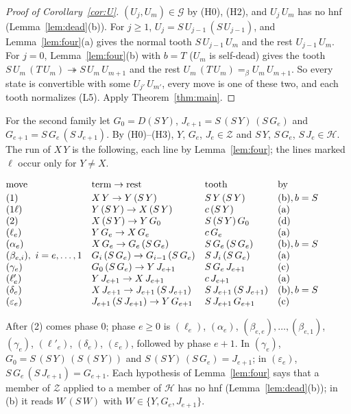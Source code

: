 \documentclass[11pt]{amsart}
\theoremstyle{definition}
\newcommand{\red}{\twoheadrightarrow}
\newcommand{\conv}{=_\beta}
\newcommand{\Hc}{\mathcal H}
\newcommand{\Gc}{\mathcal G}
\newcommand{\Zc}{\mathcal Z}
\begin{document}
\begin{proof}[Proof of Corollary~\ref{cor:U}]
$(U_j,U_m)\in\Gc$ by (H0), (H2), and $U_j\,U_m$ has no hnf (Lemma~\ref{lem:dead}(b)). For $j\ge1$,
$U_j=S\,U_{j-1}\,(S\,U_{j-1})$, and Lemma~\ref{lem:four}(a) gives the normal tooth
$S\,U_{j-1}\,U_m$ and the rest $U_{j-1}\,U_m$. For $j=0$, Lemma~\ref{lem:four}(b) with $b=T$
($U_m$ is self-dead) gives the tooth $S\,U_m\,(T\,U_m)\red S\,U_m\,U_{m+1}$ and the rest
$U_m\,(T\,U_m)\conv U_m\,U_{m+1}$. So every state is convertible with some $U_{j'}\,U_{m'}$, every
move is one of these two, and each tooth normalizes (L5). Apply
Theorem~\ref{thm:main}.
\end{proof}

For the second family let $G_0=D(S\,Y)$, $J_{e+1}=S\,(S\,Y)\,(S\,G_e)$ and
$G_{e+1}=S\,G_e\,(S\,J_{e+1})$. By (H0)--(H3), $Y$, $G_e$, $J_e\in\Zc$ and $S\,Y$, $S\,G_e$,
$S\,J_e\in\Hc$. The run of $X\,Y$ is the following, each line by
Lemma~\ref{lem:four}; the lines marked $\ell$ occur only for $Y\ne X$.
\begin{center}\small
$\begin{array}{@{}llll@{}}
\text{move} & \text{term}\to\text{rest} & \text{tooth} & \text{by}\\[2pt]
(1) & X\,Y\to Y\,(S\,Y) & S\,Y\,(S\,Y) & \text{(b)}, b=S\\
(1\ell) & Y\,(S\,Y)\to X\,(S\,Y) & c\,(S\,Y) & \text{(a)}\\
(2) & X\,(S\,Y)\to Y\,G_0 & S\,(S\,Y)\,G_0 & \text{(d)}\\
(\ell_e) & Y\,G_e\to X\,G_e & c\,G_e & \text{(a)}\\
(\alpha_e) & X\,G_e\to G_e\,(S\,G_e) & S\,G_e\,(S\,G_e) & \text{(b)}, b=S\\
(\beta_{e,i}),\ i=e,\dots,1 & G_i\,(S\,G_e)\to G_{i-1}\,(S\,G_e) & S\,J_i\,(S\,G_e) & \text{(a)}\\
(\gamma_e) & G_0\,(S\,G_e)\to Y\,J_{e+1} & S\,G_e\,J_{e+1} & \text{(c)}\\
(\ell'_e) & Y\,J_{e+1}\to X\,J_{e+1} & c\,J_{e+1} & \text{(a)}\\
(\delta_e) & X\,J_{e+1}\to J_{e+1}\,(S\,J_{e+1}) & S\,J_{e+1}\,(S\,J_{e+1}) & \text{(b)}, b=S\\
(\varepsilon_e) & J_{e+1}\,(S\,J_{e+1})\to Y\,G_{e+1} & S\,J_{e+1}\,G_{e+1} & \text{(c)}
\end{array}$
\end{center}
After (2) comes phase $0$; phase $e\ge0$ is $(\ell_e)$, $(\alpha_e)$, $(\beta_{e,e}),\dots,(\beta_{e,1})$,
$(\gamma_e)$, $(\ell'_e)$, $(\delta_e)$, $(\varepsilon_e)$, followed by phase $e+1$. In $(\gamma_e)$,
$G_0=S\,(S\,Y)\,(S\,(S\,Y))$ and $S\,(S\,Y)\,(S\,G_e)=J_{e+1}$; in $(\varepsilon_e)$,
$S\,G_e\,(S\,J_{e+1})=G_{e+1}$. Each hypothesis of Lemma~\ref{lem:four} says that a member of
$\Zc$ applied to a member of $\Hc$ has no hnf (Lemma~\ref{lem:dead}(b)); in (b) it reads
$W\,(S\,W)$ with $W\in\{Y,G_e,J_{e+1}\}$.
\end{document}
